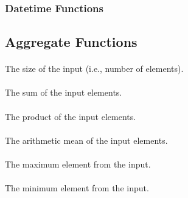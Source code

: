 
\subsubsection{Datetime Functions}


\subsection{Aggregate Functions}

\paragraph{}

The size of the input (i.e., number of elements).

\paragraph{}

The sum of the input elements.

\paragraph{}

The product of the input elements.

\paragraph{}

The arithmetic mean of the input elements.

\paragraph{}

The maximum element from the input.

\paragraph{}

The minimum element from the input.

\paragraph{}


